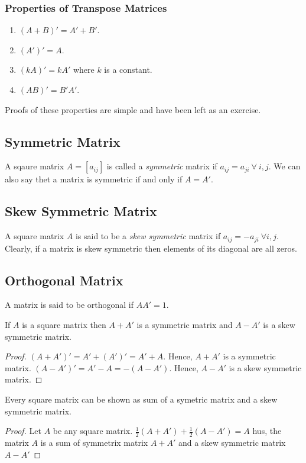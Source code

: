 \subsubsection{Properties of Transpose Matrices}
\begin{enumerate}
\item $(A + B)' = A' + B'$.
\item $(A')' = A$.
\item $(kA)' = kA'$ where $k$ is a constant.
\item $(AB)' = B'A'$.
\end{enumerate}
Proofs of these properties are simple and have been left as an exercise.

\subsection{Symmetric Matrix}
A sqaure matrix $A = [a_{ij}]$ is called a \textit{symmetric} matrix if $a_{ij} = a_{ji}~\forall~i,j$. We can also say thet a
matrix is symmetric if and only if $A = A'$.

\subsection{Skew Symmetric Matrix}
A square matrix $A$ is said to be a \textit{skew symmetric} matrix if $a_{ij} = -a_{ji}~\forall i, j$. Clearly, if a matrix is skew
symmetric then elements of its diagonal are all zeros.

\subsection{Orthogonal Matrix}
A matrix is said to be orthogonal if $AA'=1$.
\begin{theorem}
  If $A$ is a square matrix then $A + A'$ is a symmetric matrix and $A-A'$ is a skew symmetric matrix.
\end{theorem}
\begin{proof}
  $(A + A')' = A' + (A')' = A' + A$. Hence, $A + A'$ is a symmetric matrix. $(A - A')' = A' - A = -(A - A')$. Hence, $A- A'$ is a
  skew symmetric matrix.
\end{proof}

\begin{theorem}
  Every square matrix can be shown as sum of a symetric matrix and a skew   symmetric matrix.
\end{theorem}
\begin{proof}
  Let $A$ be any square matrix. $\frac{1}{2}(A + A') + \frac{1}{2}(A - A') = A$ hus, the matrix $A$ is a sum of symmetrix matrix $A
  + A'$ and a skew symmetric matrix $A - A'$
\end{proof}

